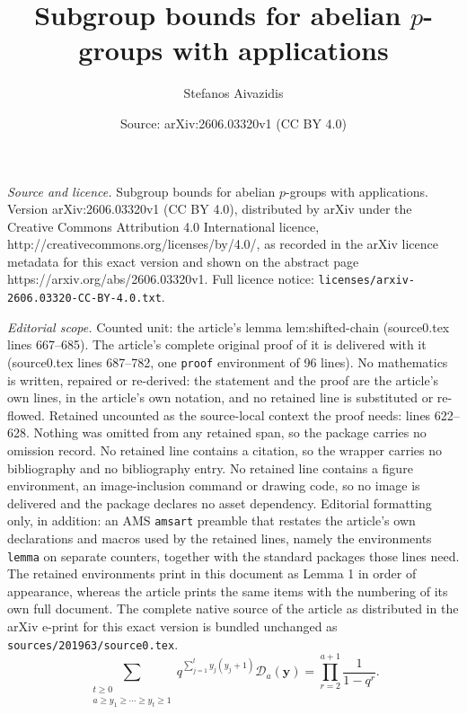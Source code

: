 \documentclass[10pt,a4paper]{amsart}
\title{Subgroup bounds for abelian $p$-groups with applications}
\author{Stefanos Aivazidis}
\date{Source: arXiv:2606.03320v1 (CC BY 4.0)}
\renewcommand{\geq}{\geqslant}
\begin{document}
\maketitle

\noindent\emph{Source and licence.} Subgroup bounds for abelian $p$-groups with applications. Version arXiv:2606.03320v1 (CC BY 4.0), distributed by arXiv under the Creative Commons Attribution 4.0 International licence, http://creativecommons.org/licenses/by/4.0/, as recorded in the arXiv licence metadata for this exact version and shown on the abstract page https://arxiv.org/abs/2606.03320v1. Full licence notice: \texttt{licenses/arxiv-2606.03320-CC-BY-4.0.txt}.\par\smallskip

\noindent\textit{Editorial scope.} Counted unit: the article's lemma lem:shifted-chain (source0.tex lines 667--685). The article's complete original proof of it is delivered with it (source0.tex lines 687--782, one \texttt{proof} environment of 96 lines). No mathematics is written, repaired or re-derived: the statement and the proof are the article's own lines, in the article's own notation, and no retained line is substituted or re-flowed.  Retained uncounted as the source-local context the proof needs: lines 622--628.  Nothing was omitted from any retained span, so the package carries no omission record.  No retained line contains a citation, so the wrapper carries no bibliography and no bibliography entry.  No retained line contains a figure environment, an image-inclusion command or drawing code, so no image is delivered and the package declares no asset dependency.  Editorial formatting only, in addition: an AMS \texttt{amsart} preamble that restates the article's own declarations and macros used by the retained lines, namely the environments \texttt{lemma} on separate counters, together with the standard packages those lines need.  The retained environments print in this document as Lemma 1 in order of appearance, whereas the article prints the same items with the numbering of its own full document.  The complete native source of the article as distributed in the arXiv e-print for this exact version is bundled unchanged as \texttt{sources/201963/source0.tex}.
\begin{equation}\label{eq:durfee-chain-shifted-square-sum}
\sum_{\substack{t\geq 0\\ a\geq y_1\geq\cdots\geq y_t\geq 1}}
        q^{\sum_{j=1}^t y_j(y_j+1)}
        \mathcal D_a(\mathbf y)
        =
        \prod_{r=2}^{a+1}\frac{1}{1-q^r}.
\end{equation}
\end{document}
